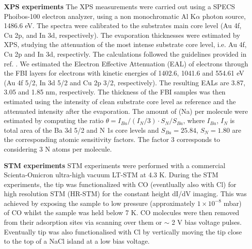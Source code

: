 \documentclass[aps,prl,reprint,longbibliography,superscriptaddress, english]{revtex4-1}
\begin{document}
\textbf{XPS experiments}
The XPS measurements were carried out using a SPECS Phoibos-100 electron analyzer, using a non monochromatic Al K$\alpha$ photon source, 1486.6 eV. The spectra were calibrated to the substrates main core level (Au 4f, Cu 2p, and In 3d, respectively). 
The evaporation thicknesses were estimated by XPS, studying the attenuation of the most intense substrate core level, i.e. Au 4f, Cu 2p and In 3d, respectivly. The calculations followed the guidelines provided in ref. \cite{powell_practical_2020}. We estimated the Electron Effective Attenuation (EAL) of electrons through the FBI layers for electrons with kinetic energies of 1402.6, 1041.6 and 554.61 eV (Au 4f 5/2, In 3d 5/2 and Cu 2p 3/2, respectively). The resulting EALs are 3.87, 3.05 and 1.85 nm, respectively. The thickness of the FBI samples was then estimated using the intensity of clean substrate core level as reference and the attenuated intensity after the evaporation. The amount of \Bapp (Na) per molecule were estimated by computing  the ratio $\theta=I_{Ba}/(I_N/3) \cdot S_N/S_{Ba} $, where $I_{Ba}$, $I_N$ is total area  of the  Ba 3d 5/2 and  N 1s  core  levels and $S_{Ba} = 25.84$, $S_N = 1.80$ are the corresponding atomic sensitivity factors\cite{scofield_hartree-slater_1976}. The factor 3 corresponds to considering 3 N atoms per molecule.

\textbf{STM experiments}
STM experiments were performed with a commercial Scienta-Omicron ultra-high vacuum LT-STM at 4.3 K. During the STM experiments, the tip was functionalized with CO (eventlually also with Cl) for high resolution STM (HR-STM) for the constant height dI/dV imaging. This was achieved by exposing the
sample to low pressure (approximately $1 \times 10^{-8}$ mbar) of CO whilst the sample was held below 7 K. CO molecules were then removed
from their adsorption sites via scanning over them or $\sim$ 2 V bias voltage pulses. Eventually tip was also functionalised with
Cl by vertically moving the tip close to the top of a NaCl island at a low bias voltage.

 



\end{document}
